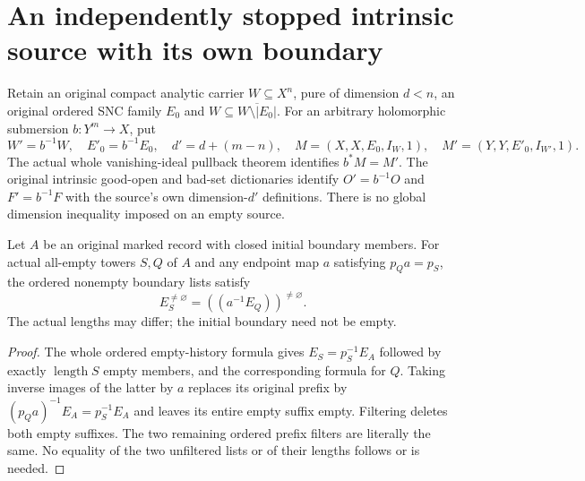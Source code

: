\section{An independently stopped intrinsic source with its own boundary}

Retain an original compact analytic carrier $W\subseteq X^n$, pure of
dimension $d<n$, an original ordered SNC family $E_0$ and
$W\subseteq\overline{W\setminus|E_0|}$.  For an arbitrary holomorphic
submersion $b:Y^m\to X$, put
\[
 W'=b^{-1}W,\quad E'_0=b^{-1}E_0,\quad d'=d+(m-n),\quad
 M=(X,X,E_0,I_W,1),\quad M'=(Y,Y,E'_0,I_{W'},1).
\]
The actual whole vanishing-ideal pullback theorem identifies $b^*M=M'$.
The original intrinsic good-open and bad-set dictionaries identify
$O'=b^{-1}O$ and $F'=b^{-1}F$ with the source's own dimension-$d'$
definitions.  There is no global dimension inequality imposed on an
empty source.

\begin{lemma}
\label{hir:original-empty-histories-filtered-boundary-comparison}
\leanok
Let $A$ be an original marked record with closed initial boundary
members.  For actual all-empty towers $S,Q$ of $A$ and any endpoint map
$a$ satisfying $p_Qa=p_S$, the ordered nonempty boundary lists satisfy
\[
 E_S^{\ne\varnothing}=((a^{-1}E_Q))^{\ne\varnothing}.
\]
The actual lengths may differ; the initial boundary need not be empty.
\end{lemma}
\begin{proof}
The whole ordered empty-history formula gives
$E_S=p_S^{-1}E_A$ followed by exactly $\operatorname{length}S$ empty
members, and the corresponding formula for $Q$.  Taking inverse images
of the latter by $a$ replaces its original prefix by
$(p_Qa)^{-1}E_A=p_S^{-1}E_A$ and leaves its entire empty suffix empty.
Filtering deletes both empty suffixes.  The two remaining ordered
prefix filters are literally the same.  No equality of the two
unfiltered lists or of their lengths follows or is needed.
\end{proof}

